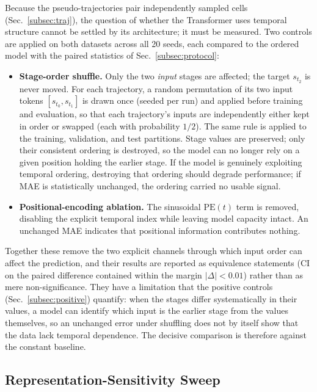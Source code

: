 \documentclass[pdflatex,sn-mathphys-num]{sn-jnl}
\theoremstyle{thmstyleone}%
\theoremstyle{thmstyletwo}%
\theoremstyle{thmstylethree}%
\begin{document}
Because the pseudo-trajectories pair independently sampled cells (Sec.~\ref{subsec:traj}), the question of whether the Transformer uses temporal structure cannot be settled by its architecture; it must be measured. Two controls are applied on both datasets across all 20 seeds, each compared to the ordered model with the paired statistics of Sec.~\ref{subsec:protocol}:
\begin{itemize}
    \item \textbf{Stage-order shuffle.} Only the two \emph{input} stages are affected; the target $s_{t_2}$ is never moved. For each trajectory, a random permutation of its two input tokens $[s_{t_0},s_{t_1}]$ is drawn once (seeded per run) and applied before training and evaluation, so that each trajectory's inputs are independently either kept in order or swapped (each with probability $1/2$). The same rule is applied to the training, validation, and test partitions. Stage values are preserved; only their consistent ordering is destroyed, so the model can no longer rely on a given position holding the earlier stage. If the model is genuinely exploiting temporal ordering, destroying that ordering should degrade performance; if MAE is statistically unchanged, the ordering carried no usable signal.
    \item \textbf{Positional-encoding ablation.} The sinusoidal $\mathrm{PE}(t)$ term is removed, disabling the explicit temporal index while leaving model capacity intact. An unchanged MAE indicates that positional information contributes nothing.
\end{itemize}
Together these remove the two explicit channels through which input order can affect the prediction, and their results are reported as equivalence statements (CI on the paired difference contained within the margin $|\Delta|<0.01$) rather than as mere non-significance. They have a limitation that the positive controls (Sec.~\ref{subsec:positive}) quantify: when the stages differ systematically in their values, a model can identify which input is the earlier stage from the values themselves, so an unchanged error under shuffling does not by itself show that the data lack temporal dependence. The decisive comparison is therefore against the constant baseline.

\subsection{\textbf{Representation-Sensitivity Sweep}}
\label{subsec:sensitivity}
\end{document}
